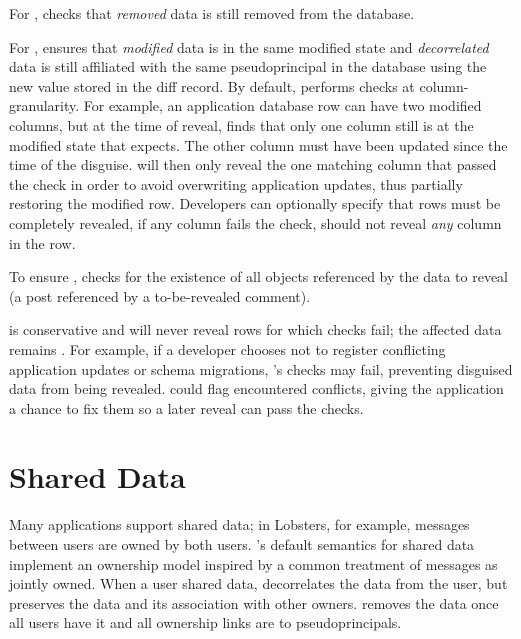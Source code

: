 For \one{}, \sys checks that \emph{removed} \xxed data is still removed from the
database.
%

%
For \two{}, \sys ensures that \emph{modified} \xxed data is in the same modified
state and \emph{decorrelated} \xxed data is still affiliated with the same
pseudoprincipal in the database using the new value stored in the diff record.
%
By default, \sys performs checks at column-granularity. For example, an application
database row can have two modified columns, but at the time of reveal, \sys
finds that only one column still is at the modified state that \sys expects. The
other column must have been updated since the time of the disguise.  \sys will
then only reveal the one matching column that passed the check in order to avoid
overwriting application updates, thus partially restoring the modified row.
Developers can optionally specify that rows must be completely revealed, \ie if
any column fails the check, \sys should not reveal \emph{any} column in the row.
%

%
To ensure \three{}, \sys checks for the existence of all objects referenced by
the data to reveal (\eg a post referenced by a to-be-revealed comment).

\sys is conservative and will never reveal rows for which checks fail; the
affected data remains \xxed.  For example, if a developer chooses not to
register conflicting application updates or schema migrations, \sys's checks may
fail, preventing disguised data from being revealed.
%
\sys could flag encountered conflicts, giving the application a chance to fix
them so a later reveal can pass the checks.



\section{Shared Data}
\label{s:shared}
%
Many applications support shared data; in Lobsters, for example, messages
between users are owned by both users.
%
\sys's default semantics for shared data implement an ownership model inspired
by a common treatment of messages as jointly owned.
%
When a user \xxs shared data, \sys decorrelates the data from the \xxing user,
but preserves the data and its association with other owners.
%
\sys removes the data once all users have \xxed it and all ownership links are
to pseudoprincipals.
%

